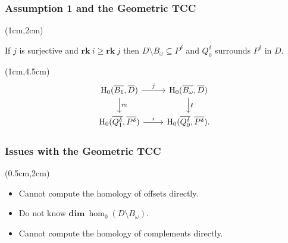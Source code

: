 \begin{frame}
  \frametitle{{\small Assumption 1 and the Geometric TCC}}

  \begin{textblock*}{11cm}(1cm,2cm)
    \begin{small}\begin{theorem}
        If $j$ is surjective and $\mathbf{rk}~i\geq \mathbf{rk}~j$ then $D\setminus B_\omega\subseteq P^\delta$ and $Q_0^\delta$ surrounds $P^\delta$ in $D$.
    \end{theorem}\end{small}
  \end{textblock*}

  \begin{textblock*}{11cm}(1cm,4.5cm)
    \[\begin{tikzcd}[ampersand replacement=\&]
      \hom_0(\overline{B_1},\overline{D})\arrow{d}{m} \arrow{r}{j} \&
      \hom_0(\overline{B_\omega}, \overline{D}) \arrow{d}{\ell} \\
      \hom_0(\overline{Q_1^\delta}, \overline{P^\delta}) \arrow{r}{i} \&
      \hom_0(\overline{Q_0^\delta}, \overline{P^\delta}).
    \end{tikzcd}\]
  \end{textblock*}
\end{frame}


\begin{frame}
  \frametitle{Issues with the Geometric TCC}

  \begin{textblock*}{12cm}(0.5cm,2cm)
    \begin{small}
      \begin{itemize}
        \item Cannot compute the homology of offsets directly.
        \item Do not know $\mathbf{dim}~\hom_0(D\setminus B_\omega)$.
        \item Cannot compute the homology of complements directly.
      \end{itemize}
    \end{small}
  \end{textblock*}

\end{frame}

